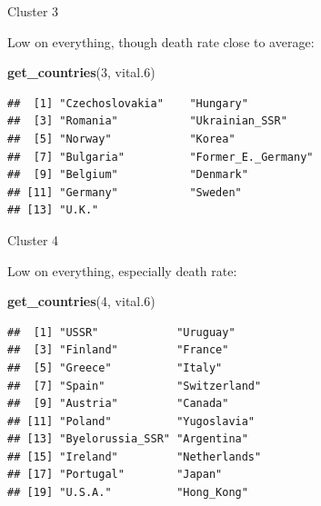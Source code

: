\documentclass[ignorenonframetext,]{beamer}
\newenvironment{Shaded}{\begin{snugshade}}{\end{snugshade}}
\newcommand{\DecValTok}[1]{\textcolor[rgb]{0.00,0.00,0.81}{#1}}
\newcommand{\FloatTok}[1]{\textcolor[rgb]{0.00,0.00,0.81}{#1}}
\newcommand{\KeywordTok}[1]{\textcolor[rgb]{0.13,0.29,0.53}{\textbf{#1}}}
\newcommand{\NormalTok}[1]{#1}
\begin{document}
\begin{frame}[fragile]{Cluster 3}
\protect\hypertarget{cluster-3-1}{}

Low on everything, though death rate close to average: \footnotesize

\begin{Shaded}
\begin{Highlighting}[]
\KeywordTok{get_countries}\NormalTok{(}\DecValTok{3}\NormalTok{, vital}\FloatTok{.6}\NormalTok{)}
\end{Highlighting}
\end{Shaded}

\begin{verbatim}
##  [1] "Czechoslovakia"    "Hungary"          
##  [3] "Romania"           "Ukrainian_SSR"    
##  [5] "Norway"            "Korea"            
##  [7] "Bulgaria"          "Former_E._Germany"
##  [9] "Belgium"           "Denmark"          
## [11] "Germany"           "Sweden"           
## [13] "U.K."
\end{verbatim}

\normalsize

\end{frame}

\begin{frame}[fragile]{Cluster 4}
\protect\hypertarget{cluster-4}{}

Low on everything, especially death rate: \small

\begin{Shaded}
\begin{Highlighting}[]
\KeywordTok{get_countries}\NormalTok{(}\DecValTok{4}\NormalTok{, vital}\FloatTok{.6}\NormalTok{)}
\end{Highlighting}
\end{Shaded}

\begin{verbatim}
##  [1] "USSR"            "Uruguay"        
##  [3] "Finland"         "France"         
##  [5] "Greece"          "Italy"          
##  [7] "Spain"           "Switzerland"    
##  [9] "Austria"         "Canada"         
## [11] "Poland"          "Yugoslavia"     
## [13] "Byelorussia_SSR" "Argentina"      
## [15] "Ireland"         "Netherlands"    
## [17] "Portugal"        "Japan"          
## [19] "U.S.A."          "Hong_Kong"
\end{verbatim}

\normalsize

\end{frame}
\end{document}
